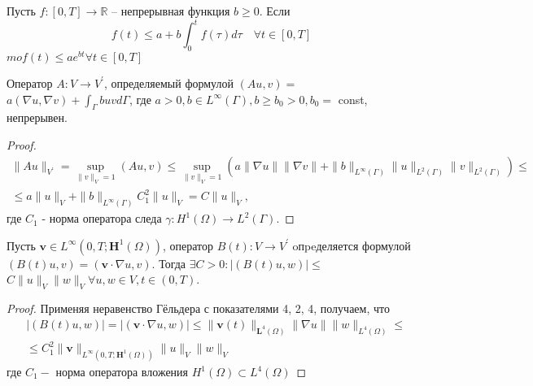 \begin{lemma}[Гронуолл]
    \label{lm:1_5:24}\cite[191]{Gaevskii1978}
    Пусть $f:[0, T] \rightarrow \mathbb{R}$ -- непрерывная функция $b \geq 0$.
    Если
    \[
        f(t) \leq a+b \int_{0}^{t} f(\tau) d \tau \quad \forall t \in[0, T]
    \]
    $m o f(t) \leq a e^{b t} \forall t \in[0, T]$
\end{lemma}

\begin{lemma}
    \label{lm:1_5:25}
    Оператор $A: V \rightarrow V^{\prime}$, определяемый формулой
    $(A u, v)=$ $a(\nabla u, \nabla v)+\int_{\Gamma} b u v d \Gamma$,
    где $a>0, b \in L^{\infty}(\Gamma), b \geq b_{0}>0, b_{0}=$
    const, непрерывен.
\end{lemma}

\begin{proof}
    \[
        \begin{array}{r}
            \|A u\|_{V^{\prime}}=\sup _{\|v\|_{V}=1}(A u, v)
            \leq \sup _{\|v\|_{V}=1}\left(a\|\nabla u\|\|\nabla v\|
            +\|b\|_{L^{\infty}(\Gamma)}\|u\|_{L^{2}(\Gamma)}\|v\|_{L^{2}(\Gamma)}\right) \leq \\
            \leq a\|u\|_{V}+\|b\|_{L^{\infty}(\Gamma)} C_{1}^{2}\|u\|_{V}=C\|u\|_{V},
        \end{array}
    \]
    где $C_{1}$ - норма оператора следа
    $\gamma: H^{1}(\Omega) \rightarrow L^{2}(\Gamma)$.
\end{proof}

\begin{lemma}
    \label{lm:1_5:26}
    Пусть $\mathbf{v} \in L^{\infty} \left(0, T; \mathbf{H}^{1}(\Omega)\right)$,
    оператор $B(t): V \rightarrow V^{\prime}$ oпpeделяется формулой
    $(B(t) u, v)=(\mathbf{v} \cdot \nabla u, v)$.
    Тогда $\exists C>0:|(B(t) u, w)|
    \leq$ $C\|u\|_{V}\|w\|_{V} \forall u, w \in V, t \in(0, T)$.
\end{lemma}

\begin{proof}
    Применяя неравенство Гёльдера с показателями 4, 2, 4, получаем, что
    \[
        \begin{aligned}
            & |(B(t) u, w)|=|(\mathbf{v} \cdot \nabla u, w)|
            \leq\|\mathbf{v}(t)\|_{\mathbf{L}^{4}(\Omega)}
            \|\nabla u\|\|w\|_{L^{4}(\Omega)} \leq \\
            & \leq C_{1}^{2}\|\mathbf{v}\|_{L^{\infty}\left(0, T; \mathbf{H}^{1}
            (\Omega)\right)}\|u\|_{V}\|w\|_{V}
        \end{aligned}
    \]
    где $C_{1}-$ норма оператора вложения $H^{1}(\Omega) \subset L^{4}(\Omega)$
\end{proof}

